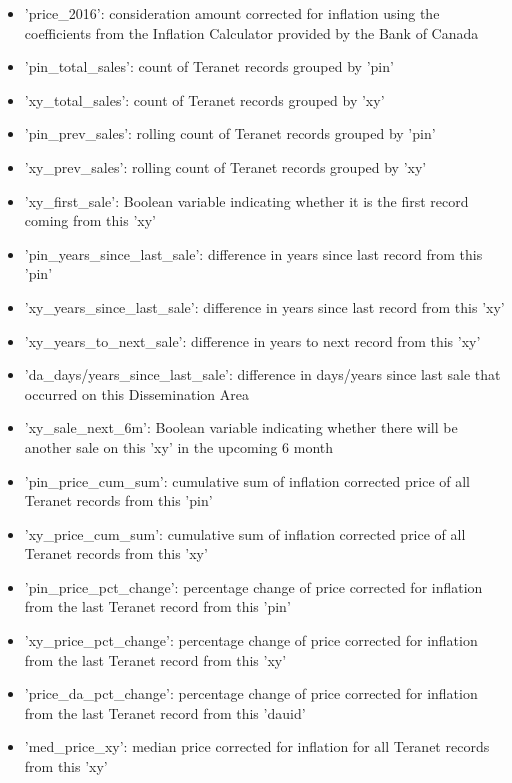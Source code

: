 \begin{itemize}
    \item 'price\_2016': consideration amount corrected for inflation using the coefficients from the Inflation Calculator provided by the Bank of Canada\cite{BankofCanada2019}
    \item 'pin\_total\_sales': count of Teranet records grouped by 'pin'
    \item 'xy\_total\_sales': count of Teranet records grouped by 'xy'
    \item 'pin\_prev\_sales': rolling count of Teranet records grouped by 'pin'
    \item 'xy\_prev\_sales': rolling count of Teranet records grouped by 'xy'
    \item 'xy\_first\_sale': Boolean variable indicating whether it is the first record coming from this 'xy'
    \item 'pin\_years\_since\_last\_sale': difference in years since last record from this 'pin'
    \item 'xy\_years\_since\_last\_sale': difference in years since last record from this 'xy'
    \item 'xy\_years\_to\_next\_sale': difference in years to next record from this 'xy'
    \item 'da\_days/years\_since\_last\_sale': difference in days/years since last sale that occurred on this Dissemination Area
    \item 'xy\_sale\_next\_6m': Boolean variable indicating whether there will be another sale on this 'xy' in the upcoming 6 month
    \item 'pin\_price\_cum\_sum': cumulative sum of inflation corrected price of all Teranet records from this 'pin'
    \item 'xy\_price\_cum\_sum': cumulative sum of inflation corrected price of all Teranet records from this 'xy'
    \item 'pin\_price\_pct\_change': percentage change of price corrected for inflation from the last Teranet record from this 'pin'
    \item 'xy\_price\_pct\_change': percentage change of price corrected for inflation from the last Teranet record from this 'xy'
    \item 'price\_da\_pct\_change': percentage change of price corrected for inflation from the last Teranet record from this 'dauid'
    \item 'med\_price\_xy': median price corrected for inflation for all Teranet records from this 'xy'

\end{itemize}

